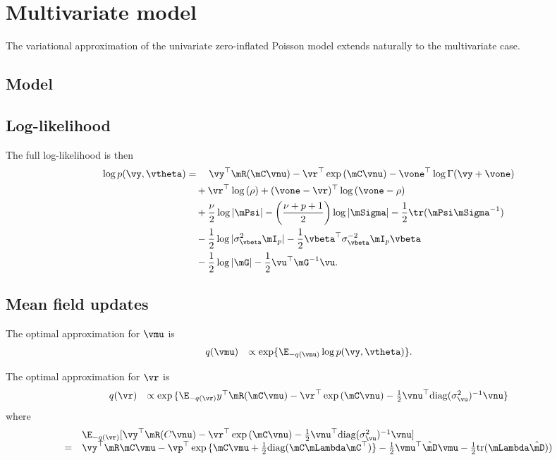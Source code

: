 \section{Multivariate model}

The variational approximation of the univariate zero-inflated Poisson model extends naturally to the
multivariate case.

\subsection{Model}

\subsection{Log-likelihood}
The full log-likelihood is then
\begin{align*}
	\log p(\vy, \vtheta) & = \quad \vy^\top \mR(\mC \vnu) - \vr^\top \exp{(\mC \vnu)} - \vone^\top \log \Gamma(\vy + \vone)                                 \\
	                     & \quad + \vr^\top \log{(\rho)} + (\vone - \vr)^\top \log{(\vone - \rho)}                                                          \\
	                     & \quad + \frac{\nu}{2} \log |\mPsi| - \left( \frac{\nu + p + 1}{2} \right) \log{|\mSigma|} - \frac{1}{2} \tr (\mPsi \mSigma^{-1}) \\
	                     & \quad - \frac{1}{2} \log{|\sigma^2_\vbeta \mI_p|} - \frac{1}{2} \vbeta^\top \sigma_\vbeta^{-2} \mI_p \vbeta                      \\
	                     & \quad - \frac{1}{2} \log |\mG| - \frac{1}{2} \vu^\top \mG^{-1} \vu.                                                                
\end{align*}

\subsection{Mean field updates}
The optimal approximation for $\vmu$ is
\[
	\begin{array}{rl}
		q(\vmu) & \propto \exp \{ \E_{-q(\vnu)} \log p(\vy, \vtheta) \}.
	\end{array}
\]

\noindent The optimal approximation for $\vr$ is
\[
	\begin{array}{rl}
		q(\vr) & \propto \exp{\{\E_{-q(\vr)}y^\top\mR(\mC\vmu) - \vr^\top\exp{(\mC\vnu)}- \frac{1}{2} \vnu^\top \text{diag}(\sigma_{\vu}^2)^{-1} \vnu\}} 
	\end{array}
\]
where
\[
	\begin{array}{rl}
		  & \E_{-q(\vr)} [\vy^\top\mR(C\vnu) - \vr^\top\exp{(\mC\vnu)}- \frac{1}{2} \vnu^\top \text{diag}(\sigma_{\vu}^2)^{-1} \vnu]                                                 \\
		= & \vy^\top\mR\mC \vmu - \vp^\top \exp{\{\mC \vmu +  \frac{1}{2} \text{diag}(\mC \mLambda \mC^\top)\}} -  \frac{1}{2} \vmu^\top \hat{\mD} \vmu - \frac{1}{2} \text{tr}(\mLambda \hat{\mD} )) 
	\end{array}
\]

